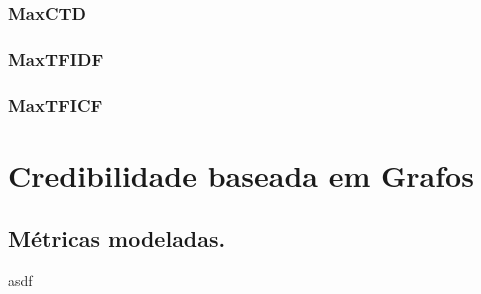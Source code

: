 \subsubsection{MaxCTD}
\label{subsubsection::maxctd}

\subsubsection{MaxTFIDF}
\label{subsubsection::maxtfidf}

\subsubsection{MaxTFICF} 
\label{subsubsection::maxtficf}

\cite{ChihHow04}

\section{Credibilidade baseada em Grafos}
\label{sec::pg_cred_baseada_grafos}

\subsection{Métricas modeladas.}
\label{subsec::pg_metricas_grafos}

asdf

